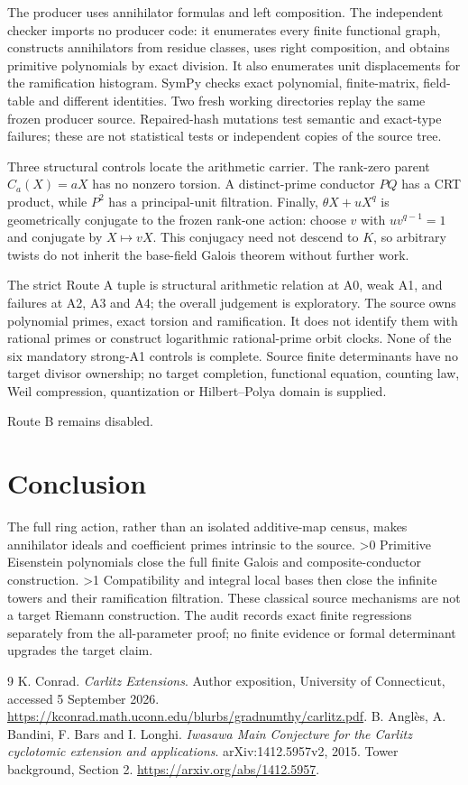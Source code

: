 \documentclass[10pt]{article}
\begin{document}
The producer uses annihilator formulas and left composition. The independent
checker imports no producer code: it enumerates every finite functional
graph, constructs annihilators from residue classes, uses right composition,
and obtains primitive polynomials by exact division. It also enumerates
unit displacements for the ramification histogram. SymPy checks exact
polynomial, finite-matrix, field-table and different identities. Two fresh
working directories replay the same frozen producer source. Repaired-hash
mutations test semantic and exact-type failures; these are not statistical
tests or independent copies of the source tree.

Three structural controls locate the arithmetic carrier. The rank-zero
parent $C_a(X)=aX$ has no nonzero torsion. A distinct-prime conductor $PQ$
has a CRT product, while $P^2$ has a principal-unit filtration. Finally,
$\theta X+uX^q$ is geometrically conjugate to the frozen rank-one action:
choose $v$ with $uv^{q-1}=1$ and conjugate by $X\mapsto vX$.
This conjugacy need not descend to $K$, so arbitrary twists do not inherit
the base-field Galois theorem without further work.

The strict Route A tuple is structural arithmetic relation at A0, weak A1,
and failures at A2, A3 and A4; the overall judgement is exploratory.
The source owns polynomial primes, exact torsion and ramification. It
does not identify them with rational primes or construct logarithmic
rational-prime orbit clocks. None of the six mandatory strong-A1 controls
is complete. Source finite determinants have no target divisor ownership;
no target completion, functional equation, counting law, Weil compression,
quantization or Hilbert--Polya domain is supplied.
\par\noindent Route B remains disabled.
\fi

\section{Conclusion}
The full ring action, rather than an isolated additive-map census, makes
annihilator ideals and coefficient primes intrinsic to the source.
\ifnum\CRevisionRound>0
Primitive Eisenstein polynomials close the full finite Galois and
composite-conductor construction.
\fi
\ifnum\CRevisionRound>1
Compatibility and integral local bases then close the infinite towers and
their ramification filtration.
\fi
These classical source mechanisms are not a target Riemann construction.
The audit records exact finite regressions separately from the all-parameter
proof; no finite evidence or formal determinant upgrades the target claim.

\begin{thebibliography}{9}
 K. Conrad. \emph{Carlitz Extensions}. Author exposition,
University of Connecticut, accessed 5 September 2026.
\url{https://kconrad.math.uconn.edu/blurbs/gradnumthy/carlitz.pdf}.
 B. Angl\`es, A. Bandini, F. Bars and I. Longhi.
\emph{Iwasawa Main Conjecture for the Carlitz cyclotomic extension and applications}.
arXiv:1412.5957v2, 2015. Tower background, Section 2.
\url{https://arxiv.org/abs/1412.5957}.
\end{thebibliography}
\end{document}

